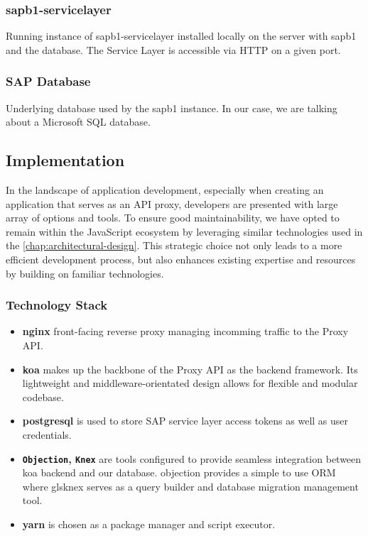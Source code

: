 \subsubsection{\gls{sapb1-servicelayer}}
Running instance of \gls{sapb1-servicelayer} installed locally on the server with \gls{sapb1} and the database. 
The Service Layer is accessible via HTTP on a given port.

\subsubsection{SAP Database}
Underlying database used by the \gls{sapb1} instance.
In our case, we are talking about a Microsoft SQL database.


\subsection{Implementation}
\label{subsec:implementation}
In the landscape of application development, especially when creating an application that serves as an API proxy, developers are presented with large array of options and tools.
To ensure good maintainability, we have opted to remain within the JavaScript ecosystem by leveraging similar technologies used in the \ref{chap:architectural-design}.
This strategic choice not only leads to a more efficient development process, but also enhances existing expertise and resources by building on familiar technologies.

\subsubsection{Technology Stack}

\begin{itemize}
    \item \textbf{\gls{nginx}} front-facing reverse proxy managing incomming traffic to the Proxy API.
    \item \textbf{\gls{koa}} makes up the backbone of the Proxy API as the backend framework. Its lightweight and middleware-orientated design allows for flexible and modular codebase. 
    \item \textbf{\gls{postgresql}} is used to store SAP service layer access tokens as well as user credentials.
    \item \textbf{\texttt{Objection}, \texttt{Knex}} are tools configured to provide seamless integration between \gls{koa} backend and our database. \gls{objection} provides a simple to use ORM where gls{knex} serves as a query builder and database migration management tool.
    \item \textbf{\gls{yarn}} is chosen as a package manager and script executor.
\end{itemize}


